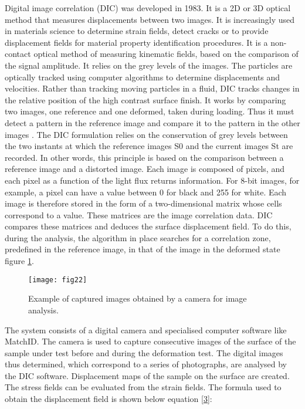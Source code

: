Digital image correlation (DIC) was developed in 1983. It is a 2D or 3D optical method that measures displacements between two images. It is increasingly used in materials science to determine strain fields, detect cracks or to provide displacement fields for material property identification procedures. It is a non-contact optical method of measuring kinematic fields, based on the comparison of the signal amplitude. It relies on the grey levels of the images. The particles are optically tracked using computer algorithms to determine displacements and velocities. Rather than tracking moving particles in a fluid, DIC tracks changes in the relative position of the high contrast surface finish. It works by comparing two images, one reference and one deformed, taken during loading. Thus it must detect a pattern in the reference image and compare it to the pattern in the other images \cite{Mambili2018}. The DIC formulation relies on the conservation of grey levels between the two instants at which the reference images S0 and the current images St are recorded. In other words, this principle is based on the comparison between a reference image and a distorted image. Each image is composed of pixels, and each pixel as a function of the light flux returns information. For 8-bit images, for example, a pixel can have a value between 0 for black and 255 for white. Each image is therefore stored in the form of a two-dimensional matrix whose cells correspond to a value. These matrices are the image correlation data. DIC compares these matrices and deduces the surface displacement field. To do this, during the analysis, the algorithm in place searches for a correlation zone, predefined in the reference image, in that of the image in the deformed state figure \ref{fig:fig22}.


\begin{figure}[htp]
	\centering
	\texttt{[image: fig22]}
	\caption{Example of captured images obtained by a camera for image analysis.}
	\label{fig:fig22}
\end{figure}

The system consists of a digital camera and specialised computer software like MatchID. The camera is used to capture consecutive images of the surface of the sample under test before and during the deformation test. The digital images thus determined, which correspond to a series of photographs, are analysed by the DIC software. Displacement maps of the sample on the surface are created. The stress fields can be evaluated from the strain fields. The formula used to obtain the displacement field is shown below equation \ref{3}:


